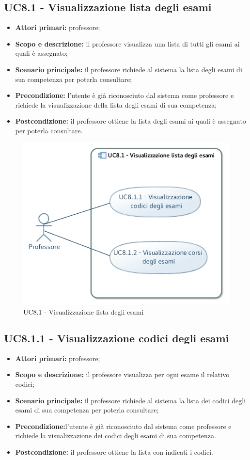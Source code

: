 \documentclass[AnalisiDeiRequisiti.tex]{subfiles}
\begin{document}
\subsection{UC8.1 - Visualizzazione lista degli esami}
\begin{itemize}
	\item \textbf{Attori primari:} professore;
	\item \textbf{Scopo e descrizione:} il professore visualizza una lista di tutti gli esami ai quali è assegnato;
	\item \textbf{Scenario principale:} il professore richiede al sistema la lista degli esami di sua competenza per poterla consultare;
	\item \textbf{Precondizione:} l'utente è già riconosciuto dal sistema come professore e richiede la visualizzazione della lista degli esami di sua competenza;
	\item \textbf{Postcondizione:} il professore ottiene la lista degli esami ai quali è assegnato per poterla consultare.
\end{itemize}
\begin{figure}[H]
	\centering
	\includegraphics[width=0.7\linewidth]{UC8_1.jpg}
	\caption{UC8.1 - Visualizzazione lista degli esami}
	\label{UC8.1 - Visualizzazione lista degli esami}
\end{figure}
\subsection{UC8.1.1 - Visualizzazione codici degli esami}
\begin{itemize}
	\item \textbf{Attori primari:} professore;
	\item \textbf{Scopo e descrizione:} il professore visualizza per ogni esame il relativo codici;
	\item \textbf{Scenario principale:} il professore richiede al sistema la lista dei codici degli esami di sua competenza per poterla consultare;
	\item \textbf{Precondizione:}l'utente è già riconosciuto dal sistema come professore e richiede la visualizzazione dei codici degli esami di sua competenza.
	\item \textbf{Postcondizione:} il professore ottiene la lista con indicati i codici.
\end{itemize}
\end{document}
